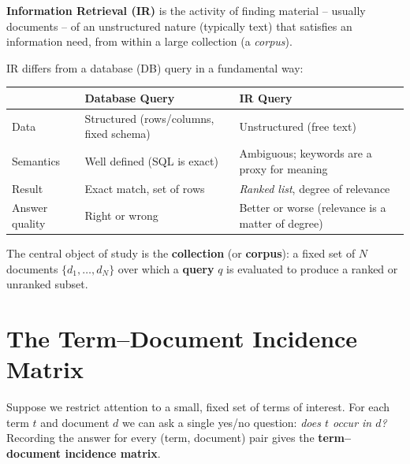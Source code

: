 \documentclass[11pt, a4paper]{article}
\begin{document}
\begin{defbox}
\textbf{Information Retrieval (IR)} is the activity of finding material -- usually documents -- of an unstructured nature (typically text) that satisfies an information need, from within a large collection (a \emph{corpus}).
\end{defbox}

IR differs from a database (DB) query in a fundamental way:

\begin{center}
\begin{tabular}{@{}p{4.2cm}p{5.2cm}p{5.2cm}@{}}
\toprule
& \textbf{Database Query} & \textbf{IR Query} \\
\midrule
Data & Structured (rows/columns, fixed schema) & Unstructured (free text) \\
Semantics & Well defined (SQL is exact) & Ambiguous; keywords are a proxy for meaning \\
Result & Exact match, set of rows & \emph{Ranked list}, degree of relevance \\
Answer quality & Right or wrong & Better or worse (relevance is a matter of degree) \\
\bottomrule
\end{tabular}
\end{center}

The central object of study is the \textbf{collection} (or \textbf{corpus}): a fixed set of $N$ documents $\{d_1,\dots,d_N\}$ over which a \textbf{query} $q$ is evaluated to produce a ranked or unranked subset.

\section{The Term--Document Incidence Matrix}

Suppose we restrict attention to a small, fixed set of terms of interest. For each term $t$ and document $d$ we can ask a single yes/no question: \emph{does $t$ occur in $d$?} Recording the answer for every (term, document) pair gives the \textbf{term--document incidence matrix}.
\end{document}

